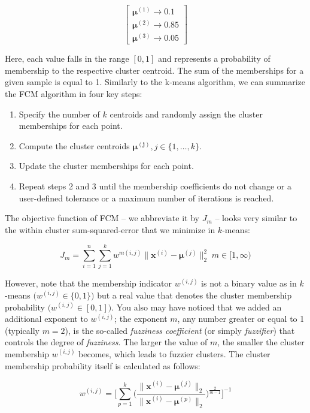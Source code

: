 \documentclass[letterpaper]{report}
\begin{document}
\[
\begin{bmatrix}
\mathbf{\mu}^{(1)} \rightarrow 0.1 \\
\mathbf{\mu}^{(2)} \rightarrow 0.85 \\
\mathbf{\mu}^{(3)} \rightarrow 0.05 
\end{bmatrix}
\]

Here, each value falls in the range $[0, 1]$ and represents a probability of membership to the respective cluster centroid. The sum of the memberships for a given sample is equal to 1. Similarly to the k-means algorithm, we can summarize the FCM algorithm in four key steps:

\begin{enumerate}
\item Specify the number of $k$ centroids and randomly assign the cluster memberships for each point.
\item Compute the cluster centroids $\mathbf{\mu^{(j)}}, j \in \{1, \dots, k \}$.
\item Update the cluster memberships for each point.
\item Repeat steps 2 and 3 until the membership coefficients do not change or a user-defined tolerance or a maximum number of iterations is reached.
\end{enumerate}

The objective function of FCM -- we abbreviate it by $J_m$ -- looks very similar to the within cluster sum-squared-error that we minimize in $k$-means:

\[
J_m = \sum_{i=1}^{n} \sum_{j=1}^{k} w^{m(i, j)} \big \lVert  \mathbf{x}^{(i)} - \mathbf{\mu}^{(j)} \big \rVert^{2}_{2} \; m \in [1, \infty)
\]

However, note that the membership indicator $w^{(i, j)}$ is not a binary value as in $k$-means $\big( w^{(i, j)} \in \{0, 1\} \big)$ but a real value that denotes the cluster membership probability $\big(  w^{(i, j)} \in [0, 1] \big).$ You also may have noticed that we added an additional exponent to $w^{(i, j)}$; the exponent $m$, any number greater or equal to 1 (typically $m=2$), is the so-called \textit{fuzziness coefficient} (or simply \textit{fuzzifier}) that controls the degree of \textit{fuzziness}. The larger the value of $m$, the smaller the cluster membership $w^{(i, j)}$ becomes, which leads to fuzzier clusters. The cluster membership probability itself is calculated as follows:

\[
w^{(i, j)} = \Bigg[ \sum^{k}_{p=1} \Bigg(  \frac{\lVert \mathbf{x}^{(i)} - \mathbf{\mu}^{(j)}  \rVert_2}{\lVert \mathbf{x}^{(i)} - \mathbf{\mu}^{(p)} \rVert_2}   \Bigg)^{\frac{2}{m-1}} \Bigg]^{-1}
\]
\end{document}
